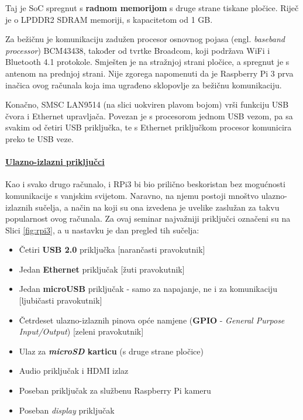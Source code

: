 \documentclass[12pt,a4paper]{article}
\begin{document}
		\par Taj je SoC spregnut s \textbf{radnom memorijom} s druge strane tiskane pločice. Riječ je o LPDDR2 SDRAM memoriji, s kapacitetom od 1 GB.

		\par Za bežičnu je komunikaciju zadužen procesor osnovnog pojasa (engl. \textit{baseband processor}) BCM43438, također od tvrtke Broadcom, koji podržava WiFi i Bluetooth 4.1 protokole. Smješten je na stražnjoj strani pločice, a spregnut je s antenom na prednjoj strani. Nije zgorega napomenuti da je Raspberry Pi 3 prva inačica ovog računala koja ima ugrađeno sklopovlje za bežičnu komunikaciju.

		\par Konačno, SMSC LAN9514 (na slici uokviren plavom bojom) vrši funkciju USB čvora i Ethernet upravljača. Povezan je s procesorom jednom USB vezom, pa sa svakim od četiri USB priključka, te s Ethernet priključkom procesor komunicira preko te USB veze.

		\paragraph{\underline{Ulazno-izlazni priključci}} %
		\label{par:IO_ports}
		
		Kao i svako drugo računalo, i RPi3 bi bio prilično beskoristan bez mogućnosti komunikacije s vanjskim svijetom. Naravno, na njemu postoji mnoštvo ulazno-izlaznih sučelja, a način na koji su ona izvedena je uvelike zaslužan za takvu popularnost ovog računala. Za ovaj seminar najvažniji priključci označeni su na Slici \ref{fig:rpi3}, a u nastavku je dan pregled tih sučelja:
		\begin{itemize}
			\item Četiri \textbf{USB 2.0} priključka [narančasti pravokutnik]
			\item Jedan \textbf{Ethernet} priključak [žuti pravokutnik]
			\item Jedan \textbf{microUSB} priključak - samo za napajanje, ne i za komunikaciju [ljubičasti pravokutnik]
			\item Četrdeset ulazno-izlaznih pinova opće namjene (\textbf{GPIO} - \textit{General Purpose Input/Output}) [zeleni pravokutnik]
			\item Ulaz za \textbf{\textit{microSD} karticu} (s druge strane pločice)
			\item Audio priključak i HDMI izlaz
			\item Poseban priključak za službenu Raspberry Pi kameru
			\item Poseban \textit{display} priključak
		\end{itemize}
\end{document}

